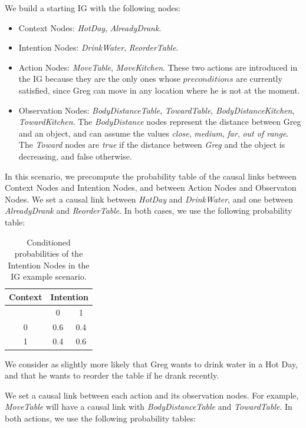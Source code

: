 We build a starting IG with the following nodes:
\begin{itemize}
	\item Context Nodes: \textit{HotDay}, \textit{AlreadyDrank}.
	\item Intention Nodes: \textit{DrinkWater}, \textit{ReorderTable}.
	\item Action Nodes: \textit{MoveTable}, \textit{MoveKitchen}. These two actions are introduced in the IG because they are the only ones whose $preconditions$ are currently satisfied, since Greg can move in any location where he is not at the moment.
	\item Observation Nodes: \textit{BodyDistanceTable}, \textit{TowardTable}, \textit{BodyDistanceKitchen}, \textit{TowardKitchen}. The \textit{BodyDistance} nodes represent the distance between Greg and an object, and can assume the values \textit{close}, \textit{medium}, \textit{far}, \textit{out of range}. The \textit{Toward} nodes are \textit{true} if the distance between \textit{Greg} and the object is decreasing, and false otherwise.
\end{itemize}


In this scenario, we precompute the probability table of the causal links between Context Nodes and Intention Nodes, and between Action Nodes and Observaton Nodes. We set a causal link between \textit{HotDay} and \textit{DrinkWater}, and one between \textit{AlreadyDrank} and \textit{ReorderTable}. In both cases, we use the following probability table:

 \begin{table}[h!]
\centering
\begin{tabular}{|c|c|c|}
\hline
Context & \multicolumn{2}{|c|}{Intention} \\ \hline \hline
& 0 & 1 \\ \hline
0  & 0.6 & 0.4 \\ \hline
1 & 0.4 & 0.6 \\ \hline
\end{tabular}
\caption[Belief models in the IG scenario]{Conditioned probabilities of the Intention Nodes in the IG example scenario.}
 \label{table:situation_assessment-ig_intention}    
\end{table}

We consider as slightly more likely that Greg wants to drink water in a Hot Day, and that he wants to reorder the table if he drank recently.

We set a causal link between each action and its observation nodes. For example, \textit{MoveTable} will have a causal link with \textit{BodyDistanceTable} and \textit{TowardTable}. In both actions, we use the following probability tables:

